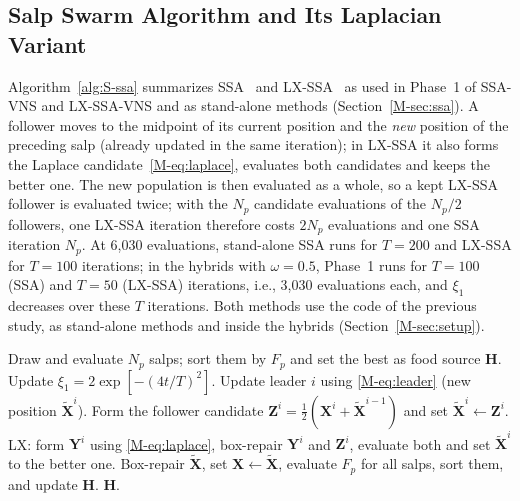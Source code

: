 \documentclass[10pt]{article}
\begin{document}
\subsection{Salp Swarm Algorithm and Its Laplacian Variant}
\label{sec:S-ssa}
Algorithm~\ref{alg:S-ssa} summarizes SSA~\cite{Mirjalili2017} and LX-SSA~\cite{Solanki2023} as used in Phase~1 of SSA-VNS and LX-SSA-VNS and as stand-alone methods (Section~\ref{M-sec:ssa}). A follower moves to the midpoint of its current position and the \emph{new} position of the preceding salp (already updated in the same iteration); in LX-SSA it also forms the Laplace candidate~\eqref{M-eq:laplace}, evaluates both candidates and keeps the better one. The new population is then evaluated as a whole, so a kept LX-SSA follower is evaluated twice; with the $N_p$ candidate evaluations of the $N_p/2$ followers, one LX-SSA iteration therefore costs $2N_p$ evaluations and one SSA iteration $N_p$. At 6,030 evaluations, stand-alone SSA runs for $T=200$ and LX-SSA for $T=100$ iterations; in the hybrids with $\omega=0.5$, Phase~1 runs for $T=100$ (SSA) and $T=50$ (LX-SSA) iterations, i.e., 3,030 evaluations each, and $\xi_1$ decreases over these $T$ iterations. Both methods use the code of the previous study, as stand-alone methods and inside the hybrids (Section~\ref{M-sec:setup}).

\begin{algorithm}[!htb]
\caption{SSA and LX-SSA (lines marked LX: LX-SSA only); evaluations per line in brackets}
\label{alg:S-ssa}
\begin{algorithmic}[1]
\State Draw and evaluate $N_p$ salps; sort them by $F_p$ and set the best as food source $\mathbf H$. \Comment{[$N_p$]}
    \State Update $\xi_1=2\exp[-(4t/T)^2]$.
            \State Update leader $i$ using \eqref{M-eq:leader} (new position $\tilde{\mathbf X}^i$).
        \Else
            \State Form the follower candidate $\mathbf Z^i=\tfrac{1}{2}(\mathbf X^i+\tilde{\mathbf X}^{i-1})$ and set $\tilde{\mathbf X}^i\gets\mathbf Z^i$.
            \State LX: form $\mathbf Y^i$ using \eqref{M-eq:laplace}, box-repair $\mathbf Y^i$ and $\mathbf Z^i$, evaluate both and set $\tilde{\mathbf X}^i$ to the better one. 
        \EndIf
    \EndFor
    \State Box-repair $\tilde{\mathbf X}$, set $\mathbf X\gets\tilde{\mathbf X}$, evaluate $F_p$ for all salps, sort them, and update $\mathbf H$. \Comment{[$N_p$]}
\EndFor
\State \Return $\mathbf H$.
\end{algorithmic}
\end{algorithm}
\end{document}
